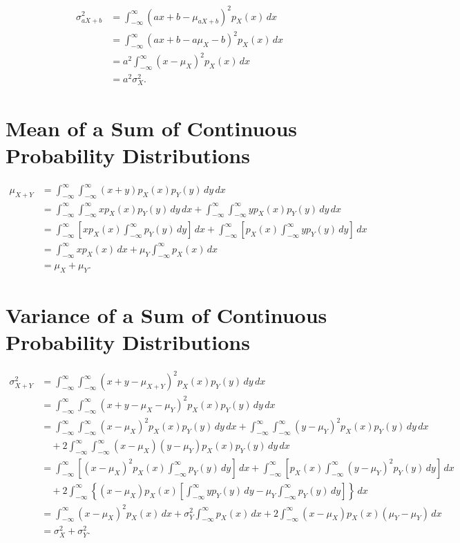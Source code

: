 \documentclass{myart}
\newcommand{\intr}{\int_{-\infty}^\infty}
\newcommand{\dx}{\,dx}
\newcommand{\dy}{\,dy}
\newcommand{\mean}{\mu}
\newcommand{\variance}{\sigma^2}
\begin{document}
\begin{align*}
\variance_{aX+b} &= \intr (ax + b - \mean_{aX+b})^2 p_X(x) \dx \\
&= \intr (ax + b - a\mean_X - b)^2 p_X(x) \dx \\
&= a^2 \intr (x - \mean_X)^2 p_X(x) \dx \\
&= a^2 \variance_X.
\end{align*}

\section{Mean of a Sum of Continuous Probability Distributions}

\begin{align*}
\mean_{X+Y} &= \intr \intr (x + y) p_X(x) p_Y(y) \dy \dx \\
&=   \intr \intr x p_X(x) p_Y(y) \dy \dx
   + \intr \intr y p_X(x) p_Y(y) \dy \dx \\
&=   \intr \left[x p_X(x) \intr p_Y(y) \dy\right] \dx
   + \intr \left[p_X(x) \intr y p_Y(y) \dy\right] \dx \\
&= \intr x p_X(x) \dx + \mean_Y \intr p_X(x) \dx \\
&= \mean_X + \mean_Y.
\end{align*}

\section{Variance of a Sum of Continuous Probability Distributions}

\begin{align*}
   \variance_{X+Y}
&= \intr \intr (x + y - \mean_{X+Y})^2 p_X(x) p_Y(y) \dy \dx \\
&= \intr \intr (x + y - \mean_X - \mean_Y)^2 p_X(x) p_Y(y) \dy \dx \\
&=   \intr \intr (x - \mean_X)^2 p_X(x) p_Y(y) \dy \dx
   + \intr \intr (y - \mean_Y)^2 p_X(x) p_Y(y) \dy \dx \\
&\quad + 2 \intr \intr (x - \mean_X)(y - \mean_Y)
             p_X(x) p_Y(y) \dy \dx \\
&=   \intr \left[(x - \mean_X)^2 p_X(x) \intr p_Y(y) \dy\right] \dx
   + \intr \left[p_X(x) \intr (y - \mean_Y)^2 p_Y(y) \dy\right] \dx \\
&\quad + 2 \intr \left\{(x - \mean_X) p_X(x) \left[
             \intr y p_Y(y) \dy - \mean_Y \intr p_Y(y)
               \dy\right]\right\} \dx \\
&=   \intr (x - \mean_X)^2 p_X(x) \dx
   + \variance_Y \intr p_X(x) \dx
   + 2 \intr (x - \mean_X) p_X(x) (\mean_Y - \mean_Y) \dx \\
&= \variance_X + \variance_Y.
\end{align*}
\end{document}
